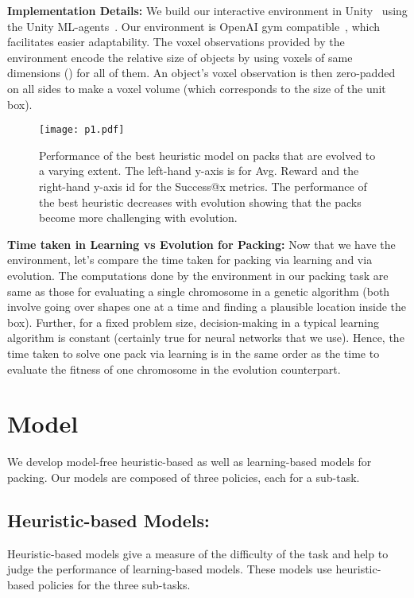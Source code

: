 \documentclass{article}
\begin{document}
\noindent\textbf{Implementation Details: }We build our interactive environment in Unity~\cite{goldstone2009unity} using the Unity ML-agents~\cite{juliani2018unity}. Our environment is OpenAI gym compatible~\cite{openai}, which facilitates easier adaptability. The voxel observations provided by the environment encode the relative size of objects by using voxels of same dimensions () for all of them. An object's voxel observation is then zero-padded on all sides to make a  voxel volume (which corresponds to the size of the unit box). 
\begin{figure}[t]
  \centering 
  \texttt{[image: p1.pdf]}
  \label{fig:evol_acc}
  \caption{Performance of the best heuristic model on packs that are evolved to a varying extent. The left-hand y-axis is for Avg. Reward and the right-hand y-axis id for the Success@x metrics. The performance of the best heuristic decreases with evolution showing that the packs become more challenging with evolution.}
  \label{fig:evol}
\end{figure}

\noindent\textbf{Time taken in Learning vs Evolution for Packing: }Now that we have the environment, let's compare the time taken for packing via learning and via evolution. The computations done by the environment in our packing task are same as those for evaluating a single chromosome in a genetic algorithm (both involve going over shapes one at a time and finding a plausible location inside the box). Further, for a fixed problem size, decision-making in a typical learning algorithm is constant (certainly true for neural networks that we use). Hence, the time taken to solve one pack via learning is in the same order as the time to evaluate the fitness of one chromosome in the evolution counterpart.

\section{Model}
\label{sec:model}
We develop model-free heuristic-based as well as learning-based models for packing. Our models are composed of three policies, each for a sub-task.

\subsection{Heuristic-based Models:}
Heuristic-based models give a measure of the difficulty of the task and help to judge the performance of learning-based models. These models use heuristic-based policies for the three sub-tasks.
\end{document}

